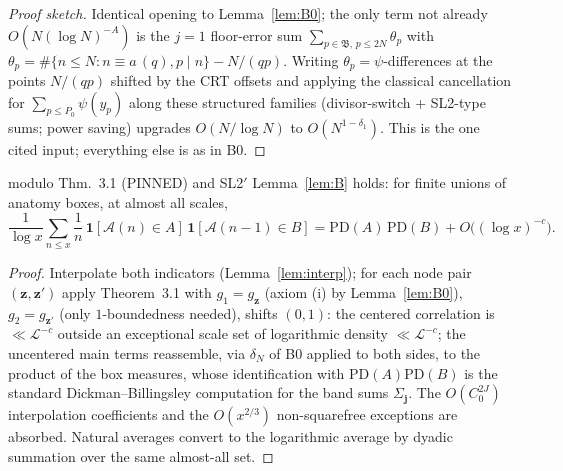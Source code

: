 \begin{proof}[Proof sketch]
Identical opening to Lemma~\ref{lem:B0}; the only term not already
$O(N(\log N)^{-A})$ is the $j=1$ floor-error sum
$\sum_{p\in\mathfrak B,\,p\le2N}\theta_p$ with
$\theta_p=\#\{n\le N:n\equiv a\,(q),p\mid n\}-N/(qp)$. Writing
$\theta_p=\psi$-differences at the points $N/(qp)$ shifted by the CRT
offsets and applying the classical cancellation for
$\sum_{p\le P_0}\psi(y_p)$ along these structured families
(divisor-switch + SL2-type sums; power saving) upgrades
$O(N/\log N)$ to $O(N^{1-\delta_1})$. This is the one cited input;
everything else is as in B0.
\end{proof}

\begin{proposition}\label{prop:B-assembled}
\statusP{} modulo \cite{TT25} Thm.~3.1 (PINNED) and SL2$'$\quad
Lemma~\ref{lem:B} holds: for finite unions of anatomy boxes, at almost
all scales,
\[
\frac1{\log x}\sum_{n\le x}\frac1n\,
\mathbf 1[\mathcal A(n)\in A]\,\mathbf 1[\mathcal A(n-1)\in B]
=\mathrm{PD}(A)\,\mathrm{PD}(B)+O\big((\log x)^{-c}\big).
\]
\end{proposition}

\begin{proof}
Interpolate both indicators (Lemma~\ref{lem:interp}); for each node
pair $(\mathbf z,\mathbf z')$ apply \cite{TT25} Theorem~3.1 with
$g_1=g_{\mathbf z}$ (axiom (i) by Lemma~\ref{lem:B0}),
$g_2=g_{\mathbf z'}$ (only $1$-boundedness needed), shifts $(0,1)$:
the centered correlation is $\ll\mathcal L^{-c}$ outside an exceptional
scale set of logarithmic density $\ll\mathcal L^{-c}$; the
uncentered main terms reassemble, via $\delta_N$ of B0 applied to both
sides, to the product of the box measures, whose identification with
$\mathrm{PD}(A)\mathrm{PD}(B)$ is the standard
Dickman--Billingsley computation for the band sums
$\Sigma_{\mathbf j}$. The $O(C_0^{2J})$ interpolation coefficients and
the $O(x^{2/3})$ non-squarefree exceptions are absorbed. Natural
averages convert to the logarithmic average by dyadic summation over
the same almost-all set.
\end{proof}
